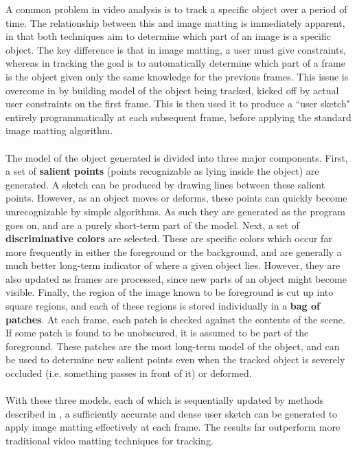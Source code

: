 A common problem in video analysis is to track a specific object over a period of time. The relationship between this and image matting is immediately apparent, in that both techniques aim to determine which part of an image is a specific object. The key difference is that in image matting, a user must give constraints, whereas in tracking the goal is to automatically determine which part of a frame is the object given only the same knowledge for the previous frames. This issue is overcome in \cite{fan10} by building model of the object being tracked, kicked off by actual user constraints on the first frame. This is then used it to produce a ``user sketch" entirely programmatically at each subsequent frame, before applying the standard image matting algorithm.
\\\\
The model of the object generated is divided into three major components. First, a set of \textbf{salient points} (points recognizable as lying inside the object) are generated. A sketch can be produced by drawing lines between these salient points. However, as an object moves or deforms, these points can quickly become unrecognizable by simple algorithms. As such they are generated as the program goes on, and are a purely short-term part of the model. Next, a set of \textbf{discriminative colors} are selected. These are specific colors which occur far more frequently in either the foreground or the background, and are generally a much better long-term indicator of where a given object lies. However, they are also updated as frames are processed, since new parts of an object might become visible. Finally, the region of the image known to be foreground is cut up into square regions, and each of these regions is stored individually in a \textbf{bag of patches}. At each frame, each patch is checked against the contents of the scene. If some patch is found to be unobscured, it is assumed to be part of the foreground. These patches are the most long-term model of the object, and can be used to determine new salient points even when the tracked object is severely occluded (i.e. something passes in front of it) or deformed.
\\\\
With these three models, each of which is sequentially updated by methods described in \cite{fan10}, a sufficiently accurate and dense user sketch can be generated to apply image matting effectively at each frame. The results far outperform more traditional video matting techniques for tracking.
